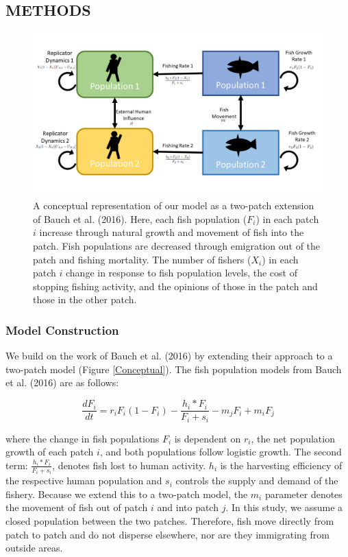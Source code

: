 \documentclass[
  12pt,
]{article}
\begin{document}
\hypertarget{methods-1}{%
\subsection{METHODS}\label{methods-1}}

\begin{figure}
\includegraphics[width=1\linewidth]{CoupledModelConceptual} \caption{A conceptual representation of our model as a two-patch extension of Bauch et al. (2016). Here, each fish population (\(F_i\)) in each patch \(i\) increase through natural growth and movement of fish into the patch. Fish populations are decreased through emigration out of the patch and fishing mortality. The number of fishers (\(X_i\)) in each patch \(i\) change in response to fish population levels, the cost of stopping fishing activity, and the opinions of those in the patch and those in the other patch. \label{Conceptual}}\label{fig:Conceptual}
\end{figure}



\hypertarget{model-construction}{%
\subsubsection{Model Construction}\label{model-construction}}

We build on the work of Bauch et al. (2016) by extending their approach to a two-patch model (Figure \ref{Conceptual}). The fish population models from Bauch et al. (2016) are as follows:

\begin{equation} 
  \frac{dF_i}{dt} = r_iF_i(1-F_i)-\frac{h_i*F_i}{F_i + s_i} - m_jF_i + m_iF_j
  \label{eq:fish1}
\end{equation}

where the change in fish populations \(F_i\) is dependent on \(r_i\), the net population growth of each patch \(i\), and both populations follow logistic growth. The second term: \(\frac{h_i*F_i}{F_i + s_i}\), denotes fish lost to human activity. \(h_i\) is the harvesting efficiency of the respective human population and \(s_i\) controls the supply and demand of the fishery. Because we extend this to a two-patch model, the \(m_i\) parameter denotes the movement of fish out of patch \(i\) and into patch \(j\). In this study, we assume a closed population between the two patches. Therefore, fish move directly from patch to patch and do not disperse elsewhere, nor are they immigrating from outside areas.
\end{document}
